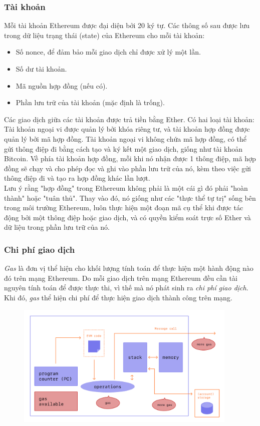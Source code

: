 \subsubsection*{Tài khoản}

Mỗi tài khoản Ethereum được đại diện bởi 20 ký tự. Các thông số sau được lưu trong dữ liệu trạng thái (state) của Ethereum cho mỗi tài khoản:
\begin{itemize}
    \item Số nonce, để đảm bảo mỗi giao dịch chỉ được xử lý một lần.
    \item Số dư tài khoản.
    \item Mã nguồn hợp đồng (nếu có).
    \item Phần lưu trữ của tài khoản (mặc định là trống).
\end{itemize}

Các giao dịch giữa các tài khoản được trả tiền bằng Ether. Có hai loại tài khoản: Tài khoản ngoại vi được quản lý bởi khóa riêng tư, và tài khoản hợp đồng được quản lý bởi mã hợp đồng. Tài khoản ngoại vi không chứa mã hợp đồng, có thể gửi thông điệp đi bằng cách tạo và ký kết một giao dịch, giống như tài khoản Bitcoin. Về phía tài khoản hợp đồng, mỗi khi nó nhận được 1 thông điệp, mã hợp đồng sẽ chạy và cho phép đọc và ghi vào phần lưu trữ của nó, kèm theo việc gửi thông điệp đi và tạo ra hợp đồng khác lần lượt.\\

Lưu ý rằng "hợp đồng" trong Ethereum không phải là một cái gì đó phải "hoàn thành" hoặc "tuân thủ". Thay vào đó, nó giống như các "thực thể tự trị" sống bên trong môi trường Ethereum, luôn thực hiện một đoạn mã cụ thể khi được tác động bởi một thông điệp hoặc giao dịch, và có quyền kiểm soát trực số Ether và dữ liệu trong phần lưu trữ của nó.

\subsubsection*{Chi phí giao dịch}

\textit{Gas} là đơn vị thể hiện cho khối lượng tính toán để thực hiện một hành động nào đó trên mạng Ethereum. Do mỗi giao dịch trên mạng Ethereum đều cần tài nguyên tính toán để được thực thi, vì thế mà nó phát sinh ra \textit{chi phí giao dịch}. Khi đó, \textit{gas} thể hiện chi phí để thực hiện giao dịch thành công trên mạng.\\

\begin{figure}[ht]
    \centering
    \includegraphics[width=400px]{anh/chuoi-khoi/ethereum-gas.png}
\end{figure}

